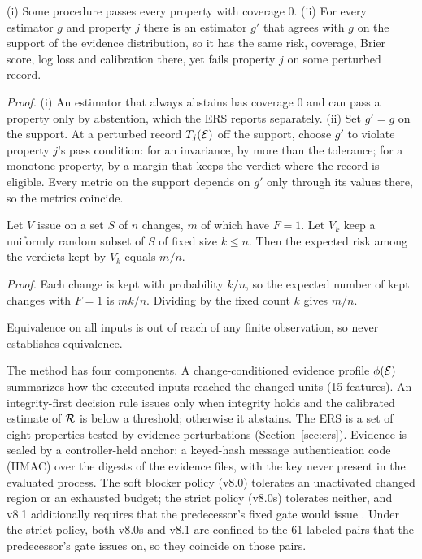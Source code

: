 \documentclass{ieeeaccess}
\begin{document}
\begin{proposition}\label{prop:indep}
(i) Some procedure passes every \ers{} property with coverage $0$. (ii) For every estimator $g$ and property $j$ there is an estimator $g'$ that agrees with $g$ on the support of the evidence distribution, so it has the same risk, coverage, Brier score, log loss and calibration there, yet fails property $j$ on some perturbed record.
\end{proposition}
\emph{Proof.} (i) An estimator that always abstains has coverage $0$ and can pass a property only by abstention, which the ERS reports separately. (ii) Set $g'=g$ on the support. At a perturbed record $T_j(\mathcal{E})$ off the support, choose $g'$ to violate property $j$'s pass condition: for an invariance, by more than the tolerance; for a monotone property, by a margin that keeps the verdict \NDO{} where the record is eligible. Every metric on the support depends on $g'$ only through its values there, so the metrics coincide.

\begin{proposition}\label{prop:random}
Let $V$ issue \NDO{} on a set $S$ of $n$ changes, $m$ of which have $F{=}1$. Let $V_k$ keep a uniformly random subset of $S$ of fixed size $k\le n$. Then the expected risk among the verdicts kept by $V_k$ equals $m/n$.
\end{proposition}
\emph{Proof.} Each change is kept with probability $k/n$, so the expected number of kept changes with $F{=}1$ is $mk/n$. Dividing by the fixed count $k$ gives $m/n$.

\begin{remark}\label{rem:equiv}
Equivalence on all inputs is out of reach of any finite observation, so \NDO{} never establishes equivalence.
\end{remark}
The method has four components. A change-conditioned evidence profile $\phi(\mathcal{E})$ summarizes how the executed inputs reached the changed units (15 features). An integrity-first decision rule issues \NDO{} only when integrity holds and the calibrated estimate of $\mathcal{R}$ is below a threshold; otherwise it abstains. The ERS is a set of eight properties tested by evidence perturbations (Section~\ref{sec:ers}). Evidence is sealed by a controller-held anchor: a keyed-hash message authentication code (HMAC) over the digests of the evidence files, with the key never present in the evaluated process. The soft blocker policy (v8.0) tolerates an unactivated changed region or an exhausted budget; the strict policy (v8.0s) tolerates neither, and v8.1 additionally requires that the predecessor's fixed gate would issue \NDO{}. Under the strict policy, both v8.0s and v8.1 are confined to the 61 labeled pairs that the predecessor's gate issues \NDO{} on, so they coincide on those pairs.
\end{document}
